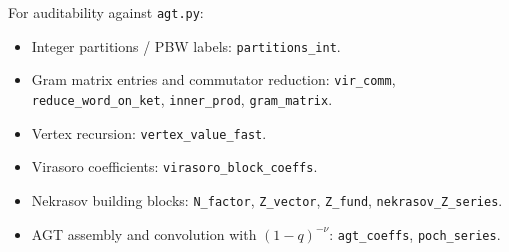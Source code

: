 \documentclass[11pt]{article}
\begin{document}
For auditability against \texttt{agt.py}:
\begin{itemize}[leftmargin=2em]
\item Integer partitions / PBW labels: \texttt{partitions\_int}.
\item Gram matrix entries and commutator reduction:
\texttt{vir\_comm}, \texttt{reduce\_word\_on\_ket}, \texttt{inner\_prod}, \texttt{gram\_matrix}.
\item Vertex recursion: \texttt{vertex\_value\_fast}.
\item Virasoro coefficients: \texttt{virasoro\_block\_coeffs}.
\item Nekrasov building blocks:
\texttt{N\_factor}, \texttt{Z\_vector}, \texttt{Z\_fund}, \texttt{nekrasov\_Z\_series}.
\item AGT assembly and convolution with $(1-q)^{-\nu}$:
\texttt{agt\_coeffs}, \texttt{poch\_series}.
\end{itemize}
\end{document}
